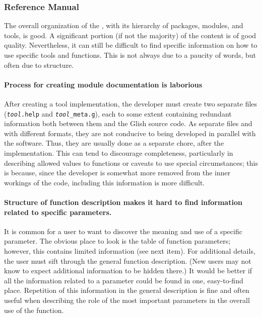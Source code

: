 \subsubsection{Reference Manual}

The overall organization of the , with its hierarchy of
packages, modules, and tools, is good.  A significant portion (if not
the majority) of the content is of good quality.  Nevertheless, it can
still be difficult to find specific information on how to use specific
tools and functions.  This is not always due to a paucity of words,
but often due to structure.  

\paragraph{Process for creating module documentation is laborious}
After creating a tool implementation, the developer must create two
separate files ({\tt {\it tool}.help} and {\tt {\it tool}\_meta.g}),
each to some extent containing redundant information both between them
and the Glish source code.  As separate files and with different
formats, they are not conducive to being developed in parallel with
the software.  Thus, they are usually done as a separate chore, after
the implementation.  This can tend to discourage completeness,
particularly in describing allowed values to functions or caveats to use
special circumstances; this is because, since the developer is
somewhat more removed from the inner workings of the code, including
this information is more difficult.  

\paragraph{Structure of function description makes it hard to find
information related to specific parameters.}  It is common for a user
to want to discover the meaning and use of a specific parameter.  The
obvious place to look is the table of function parameters; however,
this contains limited information (see next item).  For additional
details, the user must sift through the general function description.
(New users may not know to expect additional information to be hidden
there.)  It would be better if all the information related to a
parameter could be found in one, easy-to-find place.  Repetition of
this information in the general description is fine and often useful
when describing the role of the most important parameters in the
overall use of the function.

